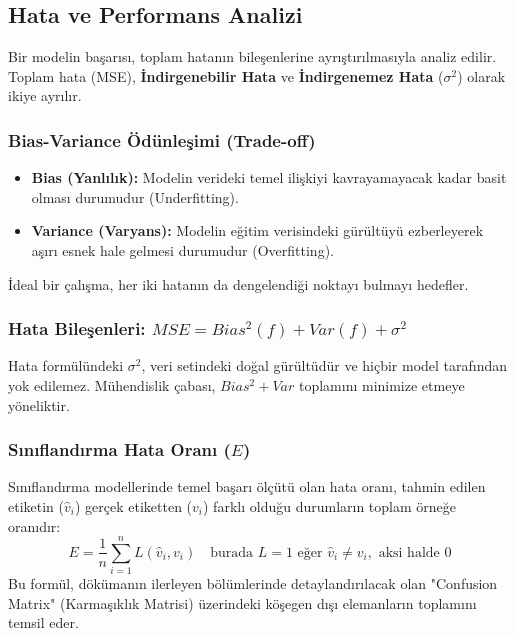 \documentclass[12pt,a4paper]{article}
\begin{document}
\newpage
\subsection{Hata ve Performans Analizi}
Bir modelin başarısı, toplam hatanın bileşenlerine ayrıştırılmasıyla analiz edilir. Toplam hata (MSE), \textbf{İndirgenebilir Hata} ve \textbf{İndirgenemez Hata} ($\sigma^2$) olarak ikiye ayrılır.

\subsubsection{Bias-Variance Ödünleşimi (Trade-off)}
\begin{itemize}
    \item \textbf{Bias (Yanlılık):} Modelin verideki temel ilişkiyi kavrayamayacak kadar basit olması durumudur (Underfitting).
    \item \textbf{Variance (Varyans):} Modelin eğitim verisindeki gürültüyü ezberleyerek aşırı esnek hale gelmesi durumudur (Overfitting).
\end{itemize}
İdeal bir çalışma, her iki hatanın da dengelendiği noktayı bulmayı hedefler.

\subsubsection{Hata Bileşenleri: $MSE = Bias^2(f) + Var(f) + \sigma^2$}
Hata formülündeki $\sigma^2$, veri setindeki doğal gürültüdür ve hiçbir model tarafından yok edilemez. Mühendislik çabası, $Bias^2 + Var$ toplamını minimize etmeye yöneliktir.

\subsubsection{Sınıflandırma Hata Oranı ($E$)}
Sınıflandırma modellerinde temel başarı ölçütü olan hata oranı, tahmin edilen etiketin ($\hat{v}_i$) gerçek etiketten ($v_i$) farklı olduğu durumların toplam örneğe oranıdır:
\begin{equation}
    E = \frac{1}{n} \sum_{i=1}^{n} L(\hat{v}_i, v_i) \quad \text{burada } L=1 \text{ eğer } \hat{v}_i \neq v_i, \text{ aksi halde } 0
\end{equation}
Bu formül, dökümanın ilerleyen bölümlerinde detaylandırılacak olan "Confusion Matrix" (Karmaşıklık Matrisi) üzerindeki köşegen dışı elemanların toplamını temsil eder.
\end{document}
